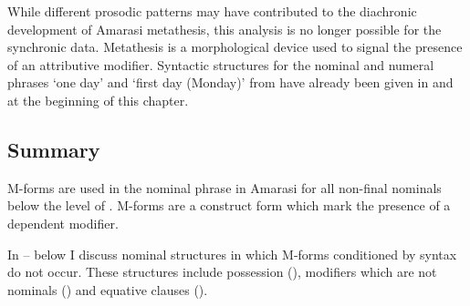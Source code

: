 While different prosodic patterns may have contributed
to the diachronic development of Amarasi metathesis,
this analysis is no longer possible for the synchronic data.
Metathesis is a morphological device used
to signal the presence of an attributive modifier.
Syntactic structures for the nominal and numeral phrases
 `one day' and  `first day (Monday)' from 
have already been given in  and 
at the beginning of this chapter.

%

\subsection{Summary}
M-forms are used in the nominal phrase in Amarasi for all non-final
nominals below the level of .
M-forms are a construct form which mark the presence of a dependent modifier.

In -- below
I discuss nominal structures in
which M-forms conditioned by syntax do not occur.
These structures include possession (),
modifiers which are not nominals ()
and equative clauses ().
